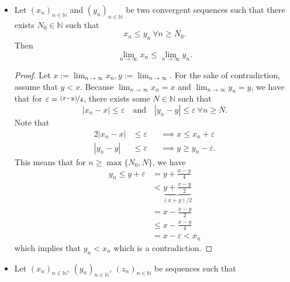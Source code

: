 \documentclass{article}
\newcommand{\N}{\mathbb{N}}
\newcommand{\seq}[2]{(#1_{#2})_{#2 \in \N}}
\newcommand{\mylim}[2]{\lim_{#1 \to #2}}
\newcommand{\?}{\stackrel{?}{=}}
\newcommand{\smallblacksquare}{\rule{0.5em}{0.5em}}
\theoremstyle{definition} %
\begin{document}
\begin{itemize}
    \item[]
          \begin{lemma}
              Let $\seq{x}{n}$ and $\seq{y}{n}$ be two convergent sequences such that there exists $N_0 \in \N$ such that
              $$x_n \leq y_n \ \forall n \geq N_0.$$
              Then
              $$\lim\limits_{n \to \infty} x_n \leq \lim\limits_{n \to \infty} y_n.$$
          \end{lemma}
          \begin{proof}
              Let $x := \mylim{n}{\infty} x_n, y := \mylim{n}{\infty}$. For the sake of contradiction, assume that $y < x$. Because $\mylim{n}{\infty} x_n = x$ and $\mylim{n}{\infty} y_n = y$, we have that for $\varepsilon = \nicefrac{(x - y)}{4}$, there exists some $N \in \N$ such that
              $$|x_n - x| \leq \varepsilon \quad \text{and} \quad |y_n - y| \leq \varepsilon \ \forall n \geq N.$$
              Note that
              \begin{alignat*}{2}
                  |x_n - x| & \leq \varepsilon &  & \implies x \leq x_n + \varepsilon  \\
                  |y_n - y| & \leq\varepsilon  &  & \implies y \geq y_n - \varepsilon.
              \end{alignat*}
              This means that for $n \geq \max\{N_0, N\}$, we have
              \begin{align*}
                  y_n \leq y + \varepsilon & = y + \frac{x - y}{4}                          \\
                                           & < \underbrace{y + \frac{x - y}{2}}_{(x + y)/2} \\
                                           & = x - \frac{x - y}{2}                          \\
                                           & \leq x - \frac{x - y}{4}                       \\
                                           & = x - \varepsilon < x_n
              \end{align*}
              which implies that $y_n < x_n$ which is a contradiction.
          \end{proof}
    \item[]
          \begin{theorem}
              Let $\seq{x}{n}$, $\seq{y}{n}$, $\seq{z}{n}$ be sequences such that
              \begin{itemize}[label=\smallblacksquare]

\end{itemize}
\end{theorem}
\end{itemize}
\end{document}
